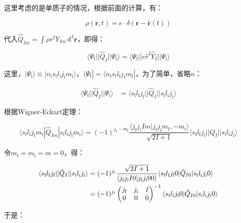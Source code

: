 \begin{booknote*}
这里考虑的是单质子的情况，根据前面的计算，有：

\[
\rho(\boldsymbol{r},t)=e\cdot\delta(\boldsymbol{r}-\hat{\boldsymbol{r}}(t))
\]

代入$\hat{Q}_{Im}=\int\rho r^{I}Y_{Im}\,\mathrm{d}^{3}\boldsymbol{r}$，即得：

\[
\langle\Psi_{\text{f}}||\hat{Q}_{I}||\Psi_{\text{i}}\rangle=\langle\Psi_{\text{f}}||e\hat{r}^{I}\hat{Y}_{I}||\Psi_{\text{i}}\rangle
\]

这里，$|\Psi_{\text{i}}\rangle\equiv|n_{\text{i}}s_{\text{i}}l_{\text{i}}j_{\text{i}}m_{\text{i}}\rangle$，$\langle\Psi_{\text{f}}|=\langle n_{\text{f}}s_{\text{f}}l_{\text{f}}j_{\text{f}}m_{\text{f}}|$，为了简单，省略$n$：

\begin{align*}
\langle\Psi_{\text{f}}||\hat{Q}_{I}||\Psi_{\text{i}}\rangle & =\langle s_{\text{f}}l_{\text{f}}j_{\text{f}}||\hat{Q}_{I}||s_{\text{i}}l_{\text{i}}j_{\text{i}}\rangle
\end{align*}

根据Wigner-Eckart定理：

\[
\langle s_{\text{f}}l_{\text{f}}j_{\text{f}}m_{\text{f}}|\hat{Q}_{Im}|s_{\text{i}}l_{\text{i}}j_{\text{i}}m_{\text{i}}\rangle=(-1)^{j_{\text{f}}-m_{\text{f}}}\frac{\langle j_{\text{f}}j_{\text{i}}Im|j_{\text{f}}j_{\text{i}}m_{\text{f}},-m_{\text{i}}\rangle}{\sqrt{2I+1}}\langle s_{\text{f}}l_{\text{f}}j_{\text{f}}||\hat{Q}_{I}||s_{\text{i}}l_{\text{i}}j_{\text{i}}\rangle
\]

令$m_{\text{f}}=m_{\text{i}}=m=0$，得：

\begin{align*}
\langle s_{\text{f}}l_{\text{f}}j_{\text{f}}||\hat{Q}_{I}||s_{\text{i}}l_{\text{i}}j_{\text{i}}\rangle & =(-1)^{j_{\text{f}}}\frac{\sqrt{2I+1}}{\langle j_{\text{f}}j_{\text{i}}I0|j_{\text{f}}j_{\text{i}}00\rangle}\langle s_{\text{f}}l_{\text{f}}j_{\text{f}}0|\hat{Q}_{I0}|s_{\text{i}}l_{\text{i}}j_{\text{i}}0\rangle\\
 & =(-1)^{j_{\text{\text{i}}}}\begin{pmatrix}j_{\text{f}} & j_{\text{i}} & I\\
0 & 0 & 0
\end{pmatrix}^{-1}\langle s_{\text{f}}l_{\text{f}}j_{\text{f}}0|\hat{Q}_{I0}|s_{\text{i}}l_{\text{i}}j_{\text{i}}0\rangle
\end{align*}

于是：


\end{booknote*}
